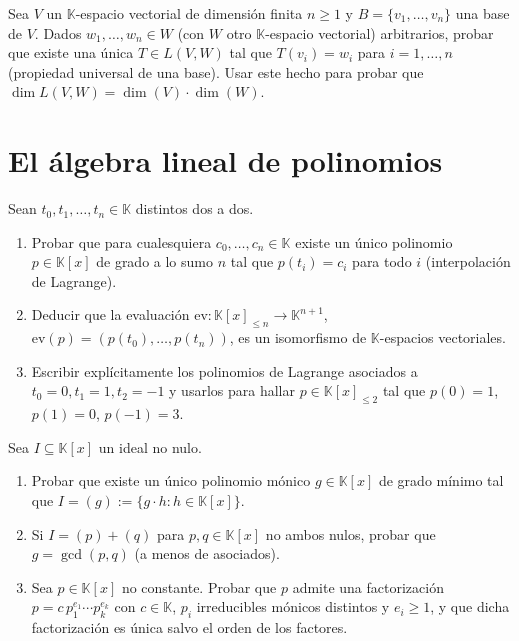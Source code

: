 \documentclass{article}
\newcommand{\K}{\mathbb{K}}
\DeclareMathOperator{\dimm}{dim}
\theoremstyle{plain}
\theoremstyle{definition}
\theoremstyle{remark}
\newenvironment{ejercicio}[1]{\begin{trivlist}
\item[\hskip \labelsep {\bfseries Ejercicio}\hskip \labelsep {\bfseries #1.}]}{\end{trivlist}}
\begin{document}
\begin{ejercicio}{6}
    Sea \(V\) un \(\K\)-espacio vectorial de dimensión finita \(n \geq 1\) y \(B = \{v_1,\ldots,v_n\}\) una base de \(V\). Dados \(w_1,\ldots,w_n \in W\) (con \(W\) otro \(\K\)-espacio vectorial) arbitrarios, probar que existe una única \(T \in L(V,W)\) tal que \(T(v_i) = w_i\) para \(i=1,\ldots,n\) (propiedad universal de una base). Usar este hecho para probar que \(\dimm L(V,W) = \dimm(V)\cdot \dimm(W)\).
\end{ejercicio}

\section{El álgebra lineal de polinomios}

\begin{ejercicio}{7}
    Sean \(t_0, t_1, \ldots, t_n \in \K\) distintos dos a dos.
    \begin{enumerate}
        \item Probar que para cualesquiera \(c_0,\ldots,c_n \in \K\) existe un único polinomio \(p \in \K[x]\) de grado a lo sumo \(n\) tal que \(p(t_i) = c_i\) para todo \(i\) (interpolación de Lagrange).
        \item Deducir que la evaluación \(\mathrm{ev}: \K[x]_{\leq n} \to \K^{n+1}\), \(\mathrm{ev}(p) = (p(t_0),\ldots,p(t_n))\), es un isomorfismo de \(\K\)-espacios vectoriales.
        \item Escribir explícitamente los polinomios de Lagrange asociados a \(t_0=0, t_1=1, t_2=-1\) y usarlos para hallar \(p \in \K[x]_{\leq 2}\) tal que \(p(0)=1\), \(p(1)=0\), \(p(-1)=3\).
    \end{enumerate}
\end{ejercicio}

\begin{ejercicio}{8}
    Sea \(I \subseteq \K[x]\) un ideal no nulo.
    \begin{enumerate}
        \item Probar que existe un único polinomio mónico \(g \in \K[x]\) de grado mínimo tal que \(I = (g) := \{g\cdot h : h \in \K[x]\}\).
        \item Si \(I = (p) + (q)\) para \(p, q \in \K[x]\) no ambos nulos, probar que \(g = \gcd(p,q)\) (a menos de asociados).
        \item Sea \(p \in \K[x]\) no constante. Probar que \(p\) admite una factorización \(p = c\, p_1^{e_1}\cdots p_k^{e_k}\) con \(c \in \K\), \(p_i\) irreducibles mónicos distintos y \(e_i \geq 1\), y que dicha factorización es única salvo el orden de los factores.
    \end{enumerate}
\end{ejercicio}
\end{document}
